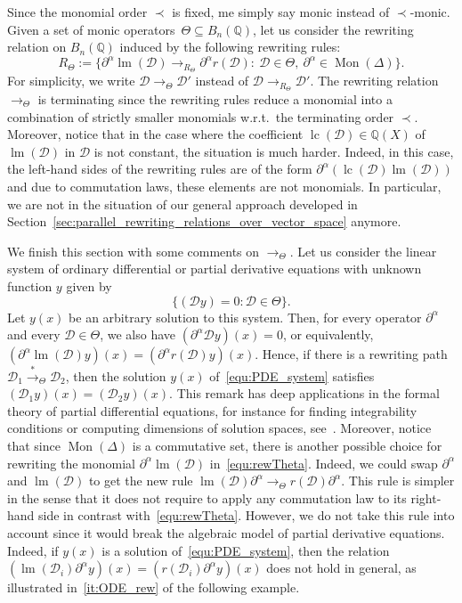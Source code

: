 \documentclass[11pt]{article}
\theoremstyle{definition}
\newcommand\D{\mathcal{D}}
\DeclareMathOperator{\lm}{lm}
\DeclareMathOperator{\lc}{lc}
\newcommand\Q{\mathbb{Q}}
\newcommand\Weyl[1]{B_{#1}(\Q)}
\newcommand\monBasis{\Mon(\Delta)}
\DeclareMathOperator{\Mon}{Mon}
\newcommand\rewTheta{\to_\Theta}
\newcommand\transTheta{\overset{*}{\to}_\Theta}
\newcommand\RTheta{R_{\Theta}}
\begin{document}
Since the monomial order $\prec$ is fixed, me simply say monic instead of
$\prec$-monic. Given a set of monic operators~$\Theta\subseteq\Weyl{n}$,
let us consider the rewriting relation on $\Weyl{n}$ induced by the
following rewriting rules: 
\begin{equation}\label{equ:rewTheta}
  \RTheta:=\Big\{\partial^\alpha\lm(\D)\to_{\RTheta}\partial^\alpha
  r(\D):\ \D\in\Theta,\ \partial^\alpha\in\Mon(\Delta)\Big\}.
\end{equation}
For simplicity, we write $\D\rewTheta\D'$ instead of
$\D\to_{R_\Theta}\D'$. The rewriting relation $\rewTheta$ is terminating
since the rewriting rules reduce a monomial into a combination of
strictly smaller monomials w.r.t.\ the terminating order $\prec$.
Moreover, notice that in the case where the coefficient $\lc(\D)\in\Q(X)$
of $\lm(\D)$ in $\D$ is not constant, the situation is much harder.
Indeed, in this case, the left-hand sides of the rewriting rules are of
the form $\partial^\alpha(\lc(\D)\lm(\D))$ and due to commutation laws,
these elements are not monomials. In particular, we are not in the
situation of our general approach developed in  
Section~\ref{sec:parallel_rewriting_relations_over_vector_space} anymore.
\medskip

We finish this section with some comments on $\rewTheta$. Let us consider 
the linear system of ordinary differential or partial derivative
equations with unknown function $y$ given by 
\begin{equation}\label{equ:PDE_system}
  \{(\D y)=0:\D\in\Theta\}.
\end{equation}
Let $y(x)$ be an arbitrary solution to this system. Then, for every
operator $\partial^\alpha$ and every $\D\in\Theta$, we also have
$(\partial^\alpha\D y)(x)=0$, or equivalently,
$(\partial^\alpha\lm(\D)y)(x)=(\partial^\alpha r(\D)y)(x)$. Hence, if
there is a rewriting path $\D_1\transTheta\D_2$, then the solution $y(x)$
of~\eqref{equ:PDE_system} satisfies $(\D_1y)(x)=(\D_2y)(x)$. This remark
has deep applications in the formal theory of partial differential
equations, for instance for finding integrability conditions or computing
dimensions of solution spaces, see~\cite{MR1308976}. Moreover, notice
that since $\monBasis$ is a commutative set, there is another possible
choice for rewriting the monomial $\partial^\alpha\lm(\D)$
in~\eqref{equ:rewTheta}. Indeed, we could swap $\partial^\alpha$ and
$\lm(\D)$ to get the new rule
$\lm(\D)\partial^\alpha\rewTheta r(\D)\partial^\alpha$. This rule is
simpler in the sense that it does not require to apply any commutation 
law to its right-hand side in contrast with~\eqref{equ:rewTheta}.
However, we do not take this rule into account since it would break the
algebraic model of partial derivative equations. Indeed, if $y(x)$ is a
solution of~\eqref{equ:PDE_system}, then the relation
$(\lm(\D_i)\partial^\alpha y)(x)=(r(\D_i)\partial^\alpha y)(x)$ does not
hold in general, as illustrated in~\ref{it:ODE_rew} of the following
example.
\smallskip
\end{document}
